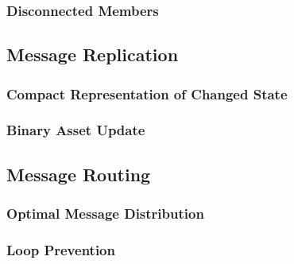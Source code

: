 \subsubsection{Disconnected Members}

\subsection{Message Replication}

\subsubsection{Compact Representation of Changed State}

\subsubsection{Binary Asset Update}

\subsection{Message Routing}

\subsubsection{Optimal Message Distribution}

\subsubsection{Loop Prevention}
